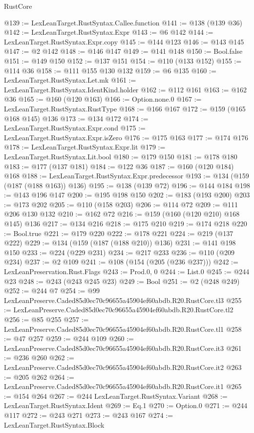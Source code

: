 \begin{lexlean}{RustCore}
\begin{coremodule}
@139 := LexLeanTarget.RustSyntax.Callee.function
@141 := @138 (@139 @36)
@142 := LexLeanTarget.RustSyntax.Expr
@143 := @6 @142
@144 := LexLeanTarget.RustSyntax.Expr.copy
@145 := @144 @123
@146 := @143 @145
@147 := @2 @142
@148 := @146 @147
@149 := @141 @148
@150 := Bool.false
@151 := @149 @150
@152 := @137 @151
@154 := @110 (@133 @152)
@155 := @114 @36
@158 := @111 @155 @130 @132
@159 := @6 @135
@160 := LexLeanTarget.RustSyntax.Let.mk
@161 := LexLeanTarget.RustSyntax.IdentKind.holder
@162 := @112 @161
@163 := @162 @36
@165 := @160 (@120 @163)
@166 := Option.none.{0}
@167 := LexLeanTarget.RustSyntax.RustType
@168 := @166 @167
@172 := @159 (@165 @168 @145) @136
@173 := @134 @172
@174 := LexLeanTarget.RustSyntax.Expr.cond
@175 := LexLeanTarget.RustSyntax.Expr.isZero
@176 := @175 @163
@177 := @174 @176
@178 := LexLeanTarget.RustSyntax.Expr.lit
@179 := LexLeanTarget.RustSyntax.Lit.bool
@180 := @179 @150
@181 := @178 @180
@183 := @177 (@137 @181)
@184 := @122 @36
@187 := @160 (@120 @184) @168
@188 := LexLeanTarget.RustSyntax.Expr.predecessor
@193 := @134 (@159 (@187 (@188 @163)) @136)
@195 := @138 (@139 @72)
@196 := @144 @184
@198 := @143 @196 @147
@200 := @195 @198 @150
@202 := @183 (@193 @200)
@203 := @173 @202
@205 := @110 (@158 @203)
@206 := @114 @72
@209 := @111 @206 @130 @132
@210 := @162 @72
@216 := @159 (@160 (@120 @210) @168 @145) @136
@217 := @134 @216
@218 := @175 @210
@219 := @174 @218
@220 := Bool.true
@221 := @179 @220
@222 := @178 @221
@224 := @219 (@137 @222)
@229 := @134 (@159 (@187 (@188 @210)) @136)
@231 := @141 @198 @150
@233 := @224 (@229 @231)
@234 := @217 @233
@236 := @110 (@209 @234)
@237 := @2 @109
@241 := @108 (@154 (@205 (@236 @237)))
@242 := LexLeanPreservation.Rust.Flags
@243 := Prod.{0, 0}
@244 := List.{0}
@245 := @244 @23
@248 := @243 (@243 @245 @23)
@249 := Bool
@251 := @2 (@248 @249)
@252 := @244 @7
@254 := @99 LexLeanPreserve.Caded85d0ec70c96655a45904ef60abdb.R20.RustCore.tl3
@255 := LexLeanPreserve.Caded85d0ec70c96655a45904ef60abdb.R20.RustCore.tl2
@256 := @85 @255
@257 := LexLeanPreserve.Caded85d0ec70c96655a45904ef60abdb.R20.RustCore.tl1
@258 := @47 @257
@259 := @244 @109
@260 := LexLeanPreserve.Caded85d0ec70c96655a45904ef60abdb.R20.RustCore.it3
@261 := @236 @260
@262 := LexLeanPreserve.Caded85d0ec70c96655a45904ef60abdb.R20.RustCore.it2
@263 := @205 @262
@264 := LexLeanPreserve.Caded85d0ec70c96655a45904ef60abdb.R20.RustCore.it1
@265 := @154 @264
@267 := @244 LexLeanTarget.RustSyntax.Variant
@268 := LexLeanTarget.RustSyntax.Ident
@269 := Eq.{1}
@270 := Option.{0}
@271 := @244 @117
@272 := @243 @271
@273 := @243 @167
@274 := LexLeanTarget.RustSyntax.Block

\end{coremodule}
\end{lexlean}
